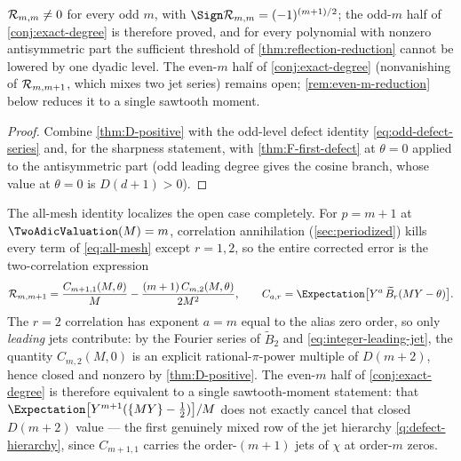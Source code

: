 \begin{corollary}
\label{cor:odd-sharp}
$\mathcal R_{m,m}\ne0$ for every odd $m$, with
$\Sign\defect_{m,m}=(-1)^{(m+1)/2}$; the odd-$m$ half of
\cref{conj:exact-degree} is therefore proved, and for every polynomial
with nonzero antisymmetric part the sufficient threshold of
\cref{thm:reflection-reduction} cannot be lowered by one dyadic level.
The even-$m$ half of \cref{conj:exact-degree} (nonvanishing of
$\mathcal R_{m,m+1}$, which mixes two jet series) remains open;
\cref{rem:even-m-reduction} below reduces it to a single sawtooth
moment.
\end{corollary}

\begin{proof}
Combine \cref{thm:D-positive} with the odd-level defect identity
\eqref{eq:odd-defect-series} and, for the sharpness statement, with
\cref{thm:F-first-defect} at $\theta=0$ applied to the antisymmetric
part (odd leading degree gives the cosine branch, whose value at
$\theta=0$ is $D(d+1)>0$).
\end{proof}

\begin{remark}
\label{rem:even-m-reduction}
The all-mesh identity localizes the open case completely.  For
$p=m+1$ at $\TwoAdicValuation(M)=m$, correlation annihilation
(\cref{sec:periodized}) kills every term of
\eqref{eq:all-mesh} except $r=1,2$, so the entire corrected error is
the two-correlation expression
\begin{equation}
 \defect_{m,m+1}
 =\frac{C_{m+1,1}(M,\theta)}{M}
 -\frac{(m+1)\,C_{m,2}(M,\theta)}{2M^{2}},
 \qquad
 C_{a,r}=\Expectation\bigl[Y^{a}\,\widetilde B_r(MY-\theta)\bigr].
 \label{eq:even-m-two-terms}
\end{equation}
The $r=2$ correlation has exponent $a=m$ equal to the alias zero
order, so only \emph{leading} jets contribute: by the Fourier series
of $\widetilde B_2$ and \eqref{eq:integer-leading-jet}, the quantity
$C_{m,2}(M,0)$ is an explicit rational-$\pi$-power multiple of
$D(m+2)$, hence closed and nonzero by \cref{thm:D-positive}.  The
even-$m$ half of \cref{conj:exact-degree} is therefore equivalent to
a single sawtooth-moment statement: that
$\Expectation\bigl[Y^{m+1}(\{MY\}-\tfrac12)\bigr]/M$ does not exactly cancel
that closed $D(m+2)$ value --- the first genuinely mixed row of the
jet hierarchy \cref{q:defect-hierarchy}, since $C_{m+1,1}$ carries
the order-$(m+1)$ jets of $\chi$ at order-$m$ zeros.
\end{remark}

